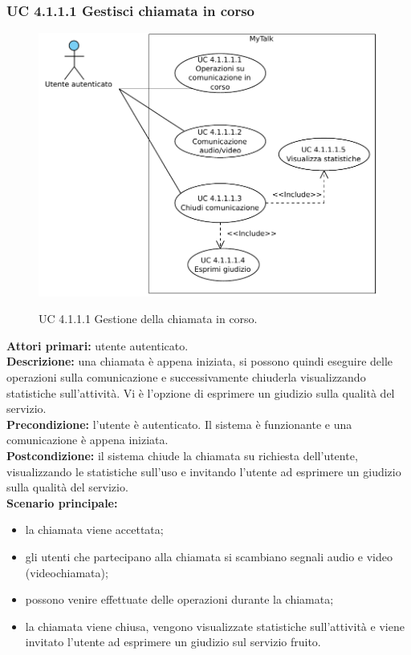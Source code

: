 \newpage

\subsubsection{UC 4.1.1.1 Gestisci chiamata in corso}
\label{sec:UC4-1-1-1GestioneChiamata}

\begin{figure}[htbp]
\centering
\includegraphics[scale=0.7]{./casi_uso/UC4-1-1-1.pdf}
\label{figUC4-1-1-1}
\caption{UC 4.1.1.1 Gestione della chiamata in corso.}
\end{figure}

\noindent\textbf{Attori primari:} utente autenticato.\\
\textbf{Descrizione:} una chiamata è appena iniziata, si possono quindi eseguire delle operazioni sulla comunicazione e successivamente chiuderla visualizzando statistiche sull'attività. Vi \`e l'opzione di esprimere un giudizio sulla qualità del servizio.\\
\textbf{Precondizione:} l'utente è autenticato. Il sistema è funzionante e una comunicazione è appena iniziata.\\
\textbf{Postcondizione:} il sistema chiude la chiamata su richiesta dell'utente, visualizzando le statistiche sull'uso e invitando l'utente ad esprimere un giudizio sulla qualità del servizio.\\
\textbf{Scenario principale:}
\begin{itemize}
\item la chiamata viene accettata;
\item gli utenti che partecipano alla chiamata si scambiano segnali audio e video (videochiamata);
\item possono venire effettuate delle operazioni durante la chiamata;
\item la chiamata viene chiusa, vengono visualizzate statistiche sull'attività e viene invitato l'utente ad esprimere un giudizio sul servizio fruito.
\end{itemize}

